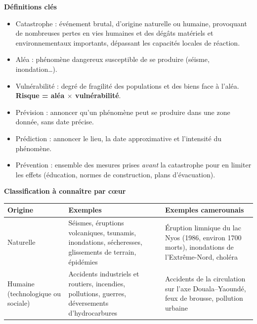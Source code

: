 \documentclass[11pt]{article}
\newcommand{\cle}[1]{{\popxbold\color{popdark}#1}}
\begin{document}
\begin{bilan}
\textbf{Définitions clés}
\begin{itemize}
  \item \cle{Catastrophe} : événement brutal, d'origine naturelle ou humaine, provoquant de nombreuses pertes en vies humaines et des dégâts matériels et environnementaux importants, dépassant les capacités locales de réaction.
  \item \cle{Aléa} : phénomène dangereux susceptible de se produire (séisme, inondation\ldots).
  \item \cle{Vulnérabilité} : degré de fragilité des populations et des biens face à l'aléa. \textbf{Risque = aléa $\times$ vulnérabilité}.
  \item \cle{Prévision} : annoncer qu'un phénomène peut se produire dans une zone donnée, sans date précise.
  \item \cle{Prédiction} : annoncer le lieu, la date approximative et l'intensité du phénomène.
  \item \cle{Prévention} : ensemble des mesures prises \emph{avant} la catastrophe pour en limiter les effets (éducation, normes de construction, plans d'évacuation).
\end{itemize}

\textbf{Classification à connaître par c\oe ur}
\begin{center}
\begin{tabularx}{\linewidth}{|l|X|X|}
\hline
\rowcolor{popblueL} \textbf{Origine} & \textbf{Exemples} & \textbf{Exemples camerounais} \\
\hline
Naturelle & Séismes, éruptions volcaniques, tsunamis, inondations, sécheresses, glissements de terrain, épidémies & Éruption limnique du lac Nyos (1986, environ \num{1700} morts), inondations de l'Extrême-Nord, choléra \\
\hline
Humaine (technologique ou sociale) & Accidents industriels et routiers, incendies, pollutions, guerres, déversements d'hydrocarbures & Accidents de la circulation sur l'axe Douala--Yaoundé, feux de brousse, pollution urbaine \\
\hline
\end{tabularx}
\end{center}


\end{bilan}
\end{document}
